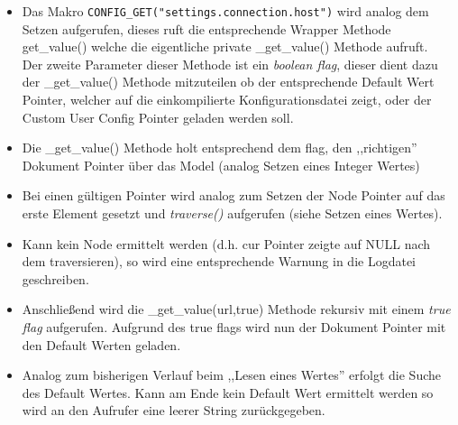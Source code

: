\begin{itemize}
    \item Das Makro \verb+CONFIG_GET("settings.connection.host")+ wird analog dem Setzen aufgerufen, dieses ruft die entsprechende Wrapper
        Methode get\_value() welche die eigentliche private \_get\_value() Methode aufruft.
        \\
        Der zweite Parameter dieser Methode ist ein \emph{boolean flag}, dieser dient dazu der \_get\_value()
        Methode mitzuteilen ob der entsprechende Default Wert Pointer, welcher auf die einkompilierte
        Konfigurationsdatei zeigt, oder der Custom User Config Pointer geladen werden soll.
    \item Die \_get\_value() Methode holt entsprechend dem flag, den ,,richtigen'' Dokument Pointer über das Model (analog Setzen eines Integer Wertes)
    \item Bei einen gültigen Pointer wird analog zum Setzen der Node Pointer auf das erste Element gesetzt und \textit{traverse()}
        aufgerufen (siehe Setzen eines Wertes).
    \item Kann kein Node ermittelt werden (d.h. cur Pointer zeigte auf NULL nach dem traversieren), so wird eine entsprechende Warnung in die Logdatei geschreiben.
    \item Anschließend wird die \_get\_value(url,true) Methode rekursiv mit einem \emph{true flag} aufgerufen. Aufgrund des true flags wird nun der Dokument Pointer mit den Default Werten geladen.
    \item Analog zum bisherigen Verlauf beim ,,Lesen eines Wertes'' erfolgt die Suche des Default Wertes. Kann am Ende kein
        Default Wert ermittelt werden so wird an den Aufrufer eine leerer String zurückgegeben.
\end{itemize}










